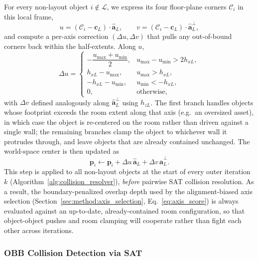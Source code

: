 For every non-layout object $i \notin \mathcal{L}$, we express its four floor-plane corners $\mathcal{C}_i$ in this local frame,
\begin{equation}
u = (\mathcal{C}_i - \mathbf{c}_L) \cdot \hat{\mathbf{a}}_L, \qquad
v = (\mathcal{C}_i - \mathbf{c}_L) \cdot \hat{\mathbf{a}}_L^{\perp},
\label{eq:room_proj}
\end{equation}
and compute a per-axis correction $(\Delta u, \Delta v)$ that pulls any out-of-bound corners back within the half-extents. Along $u$,
\begin{equation}
\Delta u =
\begin{cases}
-\dfrac{u_{\max} + u_{\min}}{2}, & u_{\max} - u_{\min} > 2 h_{xL}, \\[6pt]
h_{xL} - u_{\max}, & u_{\max} > h_{xL}, \\[3pt]
-h_{xL} - u_{\min}, & u_{\min} < -h_{xL}, \\[3pt]
0, & \text{otherwise},
\end{cases}
\label{eq:room_clamp}
\end{equation}
with $\Delta v$ defined analogously along $\hat{\mathbf{a}}_L^{\perp}$ using $h_{zL}$. The first branch handles objects whose footprint exceeds the room extent along that axis (e.g.\ an oversized asset), in which case the object is re-centered on the room rather than driven against a single wall; the remaining branches clamp the object to whichever wall it protrudes through, and leave objects that are already contained unchanged. The world-space center is then updated as
\begin{equation}
\mathbf{p}_i \gets \mathbf{p}_i + \Delta u\, \hat{\mathbf{a}}_L + \Delta v\, \hat{\mathbf{a}}_L^{\perp}.
\label{eq:room_update}
\end{equation}
This step is applied to all non-layout objects at the start of every outer iteration $k$ (Algorithm~\ref{alg:collision_resolver}), \emph{before} pairwise SAT collision resolution. As a result, the boundary-penalized overlap depth used by the alignment-biased axis selection (Section~\ref{sec:method:axis_selection}, Eq.~\eqref{eq:axis_score}) is always evaluated against an up-to-date, already-contained room configuration, so that object-object pushes and room clamping will cooperate rather than fight each other across iterations.

\subsubsection{OBB Collision Detection via SAT}
\label{sec:method:obb_sat}

